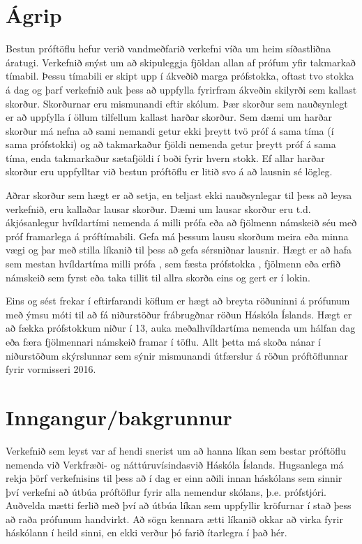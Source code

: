 \documentclass[12pt]{article}
\begin{document}
\newpage
\tableofcontents
\newpage
\section{Ágrip}
Bestun próftöflu hefur verið vandmeðfarið verkefni víða um heim síðastliðna áratugi. Verkefnið snýst um að skipuleggja fjöldan allan af prófum yfir takmarkað tímabil. Þessu tímabili er skipt upp í ákveðið marga prófstokka, oftast tvo stokka á dag og þarf verkefnið auk þess að uppfylla fyrirfram ákveðin skilyrði sem kallast skorður.
Skorðurnar eru mismunandi eftir skólum. Þær skorður sem nauðsynlegt er að uppfylla í öllum tilfellum kallast harðar skorður. Sem dæmi um harðar skorður má nefna að sami nemandi getur ekki þreytt tvö próf á sama tíma (í sama prófstokki) og að takmarkaður fjöldi nemenda getur þreytt próf á sama tíma, enda takmarkaður sætafjöldi í boði fyrir hvern stokk. Ef allar harðar skorður eru uppfylltar við bestun próftöflu er litið svo á að lausnin sé lögleg.

\medskip
Aðrar skorður sem hægt er að setja, en teljast ekki nauðsynlegar til þess að leysa verkefnið, eru kallaðar lausar skorður. Dæmi um lausar skorður eru t.d. ákjósanlegur hvíldartími nemenda á milli prófa eða að fjölmenn námskeið séu með próf framarlega á próftímabili. Gefa má þessum lausu skorðum meira eða minna vægi og þar með stilla líkanið til þess að gefa sérsniðnar lausnir. Hægt er að hafa sem mestan hvíldartíma milli prófa , sem fæsta prófstokka , fjölmenn eða erfið námskeið sem fyrst eða taka tillit til allra skorða eins og gert er í lokin.

\medskip
Eins og sést frekar í eftirfarandi köflum er hægt að breyta röðuninni á prófunum með ýmsu móti til að fá niðurstöður frábrugðnar röðun Háskóla Íslands. Hægt er að fækka prófstokkum niður í 13, auka meðalhvíldartíma nemenda um hálfan dag eða færa fjölmennari námskeið framar í töflu. Allt þetta má skoða nánar í niðurstöðum skýrslunnar sem sýnir mismunandi útfærslur á röðun próftöflunnar fyrir vormisseri 2016.
\newpage
\section{Inngangur/bakgrunnur}
Verkefnið sem leyst var af hendi snerist um að hanna líkan sem bestar próftöflu nemenda við Verkfræði- og náttúruvísindasvið Háskóla Íslands. Hugsanlega má rekja þörf verkefnisins til þess að í dag er einn aðili innan háskólans sem sinnir því verkefni að útbúa próftöflur fyrir alla nemendur skólans, þ.e. prófstjóri. Auðvelda mætti ferlið með því að útbúa líkan sem uppfyllir kröfurnar í stað þess að raða prófunum handvirkt. Að sögn kennara ætti líkanið okkar að virka fyrir háskólann í heild sinni, en ekki verður þó farið ítarlegra í það hér.
\medskip
 
\end{document}
